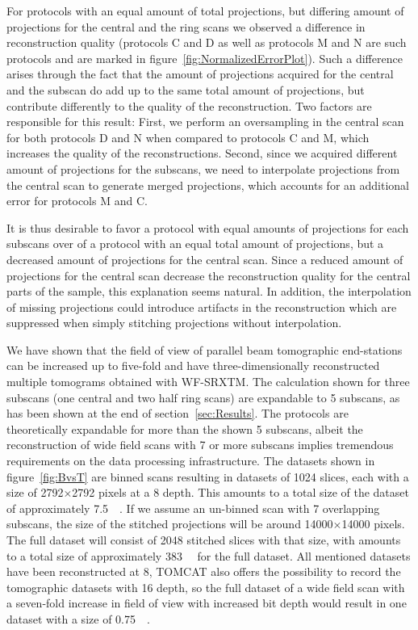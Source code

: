 For protocols with an equal amount of total projections, but differing amount of projections for the central and the ring scans we observed a difference in reconstruction quality (protocols C and D as well as protocols M and N are such protocols and are marked in figure~\ref{fig:NormalizedErrorPlot}). Such a difference arises through the fact that the amount of projections acquired for the central and the subscan do add up to the same total amount of projections, but contribute differently to the quality of the reconstruction. Two factors are responsible for this result: First, we perform an oversampling in the central scan for both protocols D and N when compared to protocols C and M, which increases the quality of the reconstructions. Second, since we acquired different amount of projections for the subscans, we need to interpolate projections from the central scan to generate merged projections, which accounts for an additional error for protocols M and C.

It is thus desirable to favor a protocol with equal amounts of projections for each subscans over of a protocol with an equal total amount of projections, but a decreased amount of projections for the central scan. Since a reduced amount of projections for the central scan decrease the reconstruction quality for the central parts of the sample, this explanation seems natural. In addition, the interpolation of missing projections could introduce artifacts in the reconstruction which are suppressed when simply stitching projections without interpolation.

We have shown that the field of view of parallel beam tomographic end-stations can be increased up to five-fold and have three-dimensionally reconstructed multiple tomograms obtained with WF-SRXTM. The calculation shown for three subscans (one central and two half ring scans) are expandable to 5 subscans, as has been shown at the end of section~\ref{sec:Results}. The protocols are theoretically expandable for more than the shown 5 subscans, albeit the reconstruction of wide field scans with 7 or more subscans implies tremendous requirements on the data processing infrastructure. The datasets shown in figure~\ref{fig:BvsT} are binned scans resulting in datasets of 1024 slices, each with a size of 2792$\times$2792 pixels at a \SI{8}{\bit} depth. This amounts to a total size of the dataset of approximately \SI{7.5}{\giga\byte}. If we assume an un-binned scan with 7 overlapping subscans, the size of the stitched projections will be around 14000$\times$14000 pixels. The full dataset will consist of 2048 stitched slices with that size, with amounts to a total size of approximately \SI{383}{\giga\byte} for the full dataset. All mentioned datasets have been reconstructed at \SI{8}{\bit}, TOMCAT also offers the possibility to record the tomographic datasets with \SI{16}{\bit} depth, so the full dataset of a wide field scan with a seven-fold increase in field of view with increased bit depth would result in one dataset with a size of \SI{0.75}{\tera\byte}.


